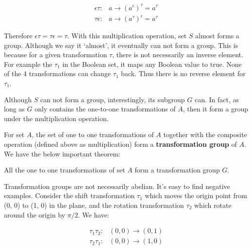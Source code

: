 \documentclass{article}
\begin{document}
\[
\begin{array}{rl}
\epsilon\tau: & a \to (a^\epsilon)^\tau = a^\tau \\
\tau\epsilon: & a \to (a^\tau)^\epsilon = a^\tau
\end{array}
\]

Therefore $\epsilon\tau = \tau\epsilon = \tau$. With this multiplication operation, set $S$ almost forms a group. Although we say it `almost', it eventually can not form a group. This is because for a given transformation $\tau$, there is not necessarily an inverse element. For example the $\tau_1$ in the Boolean set, it maps any Boolean value to true. None of the 4 transformations can change $\tau_1$ back. Thus there is no reverse element for $\tau_1$.

Although $S$ can not form a group, interestingly, its subgroup $G$ can. In fact, as long as $G$ only contains the one-to-one transformations of $A$, then it form a group under the multiplication operation.


For set $A$, the set of one to one transformations of $A$ together with the composite operation (defined above as multiplication) form a \textbf{transformation group} of $A$. We have the below important theorem:

\begin{theorem}
All the one to one transformations of set $A$ form a transformation group $G$.
\end{theorem}

Transformation groups are not necessarily abelian. It's easy to find negative examples. Consider the shift transformation $\tau_1$ which moves the origin point from (0, 0) to (1, 0) in the plane, and the rotation transformation $\tau_2$ which rotate around the origin by $\pi/2$. We have:

\[
\begin{array}{rl}
\tau_1\tau_2: & (0, 0) \to (0, 1) \\
\tau_2\tau_1: & (0, 0) \to (1, 0)
\end{array}
\]
\end{document}
